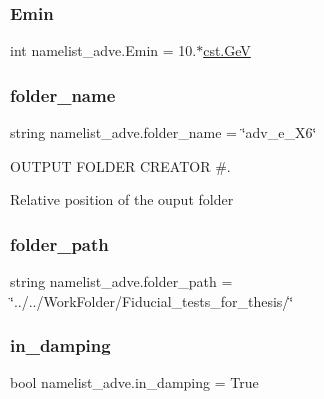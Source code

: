 \subsubsection{\texorpdfstring{Emin}{Emin}}
{\footnotesize\ttfamily int namelist\+\_\+adve.\+Emin = 10.$\ast$\hyperlink{constants_8h_aec0e126d9991db8ad0b26139f5860568}{cst.\+GeV}}

\mbox{\label{namespacenamelist__adve_a57db1b9f7ed5af1ca8879a98193fd7dd}} 
\subsubsection{\texorpdfstring{folder\+\_\+name}{folder\_name}}
{\footnotesize\ttfamily string namelist\+\_\+adve.\+folder\+\_\+name = \char`\"{}adv\+\_\+e\+\_\+\+X6\char`\"{}}



O\+U\+T\+P\+UT F\+O\+L\+D\+ER C\+R\+E\+A\+T\+OR \#. 

Relative position of the ouput folder \mbox{\label{namespacenamelist__adve_af594fa1c116bd203cc6912a56193c7a4}} 
\subsubsection{\texorpdfstring{folder\+\_\+path}{folder\_path}}
{\footnotesize\ttfamily string namelist\+\_\+adve.\+folder\+\_\+path = \char`\"{}../../Work\+Folder/Fiducial\+\_\+tests\+\_\+for\+\_\+thesis/\char`\"{}}

\mbox{\label{namespacenamelist__adve_a277eeb7878f2bb87474cd62163cd998e}} 
\subsubsection{\texorpdfstring{in\+\_\+damping}{in\_damping}}
{\footnotesize\ttfamily bool namelist\+\_\+adve.\+in\+\_\+damping = True}



